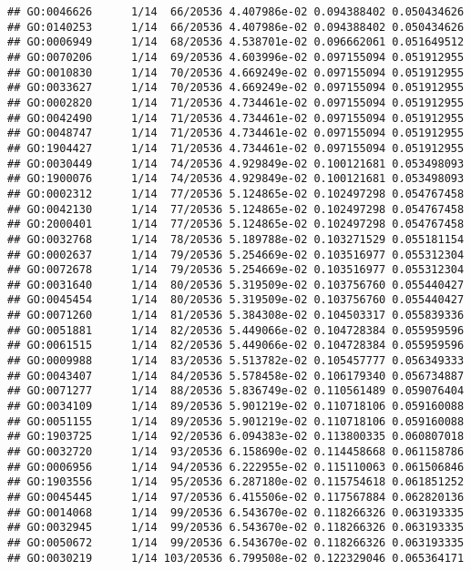 \documentclass[
]{article}
\begin{document}
\begin{verbatim}
## GO:0046626      1/14  66/20536 4.407986e-02 0.094388402 0.050434626
## GO:0140253      1/14  66/20536 4.407986e-02 0.094388402 0.050434626
## GO:0006949      1/14  68/20536 4.538701e-02 0.096662061 0.051649512
## GO:0070206      1/14  69/20536 4.603996e-02 0.097155094 0.051912955
## GO:0010830      1/14  70/20536 4.669249e-02 0.097155094 0.051912955
## GO:0033627      1/14  70/20536 4.669249e-02 0.097155094 0.051912955
## GO:0002820      1/14  71/20536 4.734461e-02 0.097155094 0.051912955
## GO:0042490      1/14  71/20536 4.734461e-02 0.097155094 0.051912955
## GO:0048747      1/14  71/20536 4.734461e-02 0.097155094 0.051912955
## GO:1904427      1/14  71/20536 4.734461e-02 0.097155094 0.051912955
## GO:0030449      1/14  74/20536 4.929849e-02 0.100121681 0.053498093
## GO:1900076      1/14  74/20536 4.929849e-02 0.100121681 0.053498093
## GO:0002312      1/14  77/20536 5.124865e-02 0.102497298 0.054767458
## GO:0042130      1/14  77/20536 5.124865e-02 0.102497298 0.054767458
## GO:2000401      1/14  77/20536 5.124865e-02 0.102497298 0.054767458
## GO:0032768      1/14  78/20536 5.189788e-02 0.103271529 0.055181154
## GO:0002637      1/14  79/20536 5.254669e-02 0.103516977 0.055312304
## GO:0072678      1/14  79/20536 5.254669e-02 0.103516977 0.055312304
## GO:0031640      1/14  80/20536 5.319509e-02 0.103756760 0.055440427
## GO:0045454      1/14  80/20536 5.319509e-02 0.103756760 0.055440427
## GO:0071260      1/14  81/20536 5.384308e-02 0.104503317 0.055839336
## GO:0051881      1/14  82/20536 5.449066e-02 0.104728384 0.055959596
## GO:0061515      1/14  82/20536 5.449066e-02 0.104728384 0.055959596
## GO:0009988      1/14  83/20536 5.513782e-02 0.105457777 0.056349333
## GO:0043407      1/14  84/20536 5.578458e-02 0.106179340 0.056734887
## GO:0071277      1/14  88/20536 5.836749e-02 0.110561489 0.059076404
## GO:0034109      1/14  89/20536 5.901219e-02 0.110718106 0.059160088
## GO:0051155      1/14  89/20536 5.901219e-02 0.110718106 0.059160088
## GO:1903725      1/14  92/20536 6.094383e-02 0.113800335 0.060807018
## GO:0032720      1/14  93/20536 6.158690e-02 0.114458668 0.061158786
## GO:0006956      1/14  94/20536 6.222955e-02 0.115110063 0.061506846
## GO:1903556      1/14  95/20536 6.287180e-02 0.115754618 0.061851252
## GO:0045445      1/14  97/20536 6.415506e-02 0.117567884 0.062820136
## GO:0014068      1/14  99/20536 6.543670e-02 0.118266326 0.063193335
## GO:0032945      1/14  99/20536 6.543670e-02 0.118266326 0.063193335
## GO:0050672      1/14  99/20536 6.543670e-02 0.118266326 0.063193335
## GO:0030219      1/14 103/20536 6.799508e-02 0.122329046 0.065364171

\end{verbatim}
\end{document}
